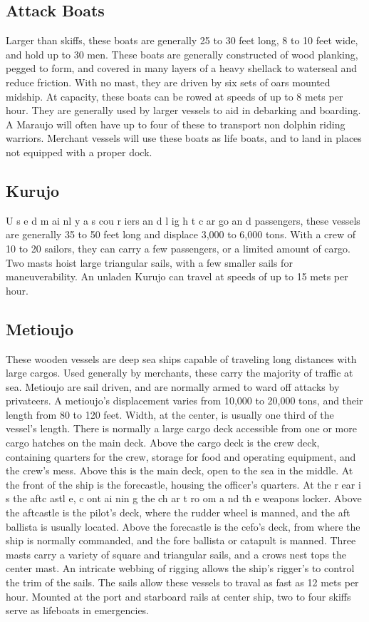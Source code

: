 \begin{multicols*}{2}
\subsection{Attack Boats}
Larger than skiffs, these boats are generally 25 to
30 feet long, 8 to 10 feet wide, and hold up to 30 men. These
boats are generally constructed of wood planking, pegged to
form, and covered in many layers of a heavy shellack to
waterseal and reduce friction. With no mast, they are driven
by six sets of oars mounted midship. At capacity, these boats
can be rowed at speeds of up to 8 mets per hour.
They are generally used by larger vessels to aid in
debarking and boarding. A Maraujo will often have up to four
of these to transport non dolphin riding warriors. Merchant
vessels will use these boats as life boats, and to land in places
not equipped with a proper dock.
\subsection{Kurujo}
U s e d m ai nl y a s cou r iers an d l ig h t c ar go an d
passengers, these vessels are generally 35 to 50 feet long and
displace 3,000 to 6,000 tons. With a crew of 10 to 20 sailors,
they can carry a few passengers, or a limited amount of cargo.
Two masts hoist large triangular sails, with a few smaller sails
for maneuverability. An unladen Kurujo can travel at speeds
of up to 15 mets per hour.
\subsection{Metioujo}
These wooden vessels are deep sea ships capable of
traveling long distances with large cargos. Used generally by
merchants, these carry the majority of traffic at sea. Metioujo
are sail driven, and are normally armed to ward off attacks by
privateers.
A metioujo’s displacement varies from 10,000 to
20,000 tons, and their length from 80 to 120 feet. Width, at
the center, is usually one third of the vessel’s length. There is
normally a large cargo deck accessible from one or more
cargo hatches on the main deck. Above the cargo deck is the
crew deck, containing quarters for the crew, storage for food
and operating equipment, and the crew’s mess. Above this is
the main deck, open to the sea in the middle. At the front of
the ship is the forecastle, housing the officer’s quarters. At the
r ear i s the aftc astl e, c ont ai nin g the ch ar t ro om a nd th e
weapons locker. Above the aftcastle is the pilot’s deck, where
the rudder wheel is manned, and the aft ballista is usually
located. Above the forecastle is the cefo’s deck, from where
the ship is normally commanded, and the fore ballista or
catapult is manned.
Three masts carry a variety of square and triangular
sails, and a crows nest tops the center mast. An intricate
webbing of rigging allows the ship’s rigger’s to control the
trim of the sails. The sails allow these vessels to traval as fast
as 12 mets per hour.
Mounted at the port and starboard rails at center
ship, two to four skiffs serve as lifeboats in emergencies.

\end{multicols*}
